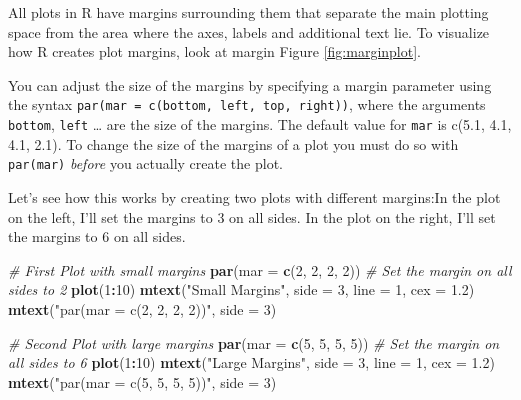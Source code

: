 \documentclass[]{book}
\newenvironment{Shaded}{\begin{snugshade}}{\end{snugshade}}
\newcommand{\KeywordTok}[1]{\textcolor[rgb]{0.13,0.29,0.53}{\textbf{#1}}}
\newcommand{\DataTypeTok}[1]{\textcolor[rgb]{0.13,0.29,0.53}{#1}}
\newcommand{\DecValTok}[1]{\textcolor[rgb]{0.00,0.00,0.81}{#1}}
\newcommand{\FloatTok}[1]{\textcolor[rgb]{0.00,0.00,0.81}{#1}}
\newcommand{\StringTok}[1]{\textcolor[rgb]{0.31,0.60,0.02}{#1}}
\newcommand{\CommentTok}[1]{\textcolor[rgb]{0.56,0.35,0.01}{\textit{#1}}}
\newcommand{\OperatorTok}[1]{\textcolor[rgb]{0.81,0.36,0.00}{\textbf{#1}}}
\newcommand{\NormalTok}[1]{#1}
\theoremstyle{definition}
\theoremstyle{definition}
\theoremstyle{remark}
\begin{document}
All plots in R have margins surrounding them that separate the main
plotting space from the area where the axes, labels and additional text
lie. To visualize how R creates plot margins, look at margin Figure
\ref{fig:marginplot}.

You can adjust the size of the margins by specifying a margin parameter
using the syntax \texttt{par(mar\ =\ c(bottom,\ left,\ top,\ right))},
where the arguments \texttt{bottom}, \texttt{left} \ldots{} are the size
of the margins. The default value for \texttt{mar} is c(5.1, 4.1, 4.1,
2.1). To change the size of the margins of a plot you must do so with
\texttt{par(mar)} \emph{before} you actually create the plot.

Let's see how this works by creating two plots with different margins:In
the plot on the left, I'll set the margins to 3 on all sides. In the
plot on the right, I'll set the margins to 6 on all sides.

\begin{Shaded}
\begin{Highlighting}[]
\CommentTok{# First Plot with small margins}
\KeywordTok{par}\NormalTok{(}\DataTypeTok{mar =} \KeywordTok{c}\NormalTok{(}\DecValTok{2}\NormalTok{, }\DecValTok{2}\NormalTok{, }\DecValTok{2}\NormalTok{, }\DecValTok{2}\NormalTok{)) }\CommentTok{# Set the margin on all sides to 2}
\KeywordTok{plot}\NormalTok{(}\DecValTok{1}\OperatorTok{:}\DecValTok{10}\NormalTok{)}
\KeywordTok{mtext}\NormalTok{(}\StringTok{"Small Margins"}\NormalTok{, }\DataTypeTok{side =} \DecValTok{3}\NormalTok{, }\DataTypeTok{line =} \DecValTok{1}\NormalTok{, }\DataTypeTok{cex =} \FloatTok{1.2}\NormalTok{)}
\KeywordTok{mtext}\NormalTok{(}\StringTok{"par(mar = c(2, 2, 2, 2))"}\NormalTok{, }\DataTypeTok{side =} \DecValTok{3}\NormalTok{)}

\CommentTok{# Second Plot with large margins}
\KeywordTok{par}\NormalTok{(}\DataTypeTok{mar =} \KeywordTok{c}\NormalTok{(}\DecValTok{5}\NormalTok{, }\DecValTok{5}\NormalTok{, }\DecValTok{5}\NormalTok{, }\DecValTok{5}\NormalTok{)) }\CommentTok{# Set the margin on all sides to 6}
\KeywordTok{plot}\NormalTok{(}\DecValTok{1}\OperatorTok{:}\DecValTok{10}\NormalTok{)}
\KeywordTok{mtext}\NormalTok{(}\StringTok{"Large Margins"}\NormalTok{, }\DataTypeTok{side =} \DecValTok{3}\NormalTok{, }\DataTypeTok{line =} \DecValTok{1}\NormalTok{, }\DataTypeTok{cex =} \FloatTok{1.2}\NormalTok{)}
\KeywordTok{mtext}\NormalTok{(}\StringTok{"par(mar = c(5, 5, 5, 5))"}\NormalTok{, }\DataTypeTok{side =} \DecValTok{3}\NormalTok{)}
\end{Highlighting}
\end{Shaded}
\end{document}
